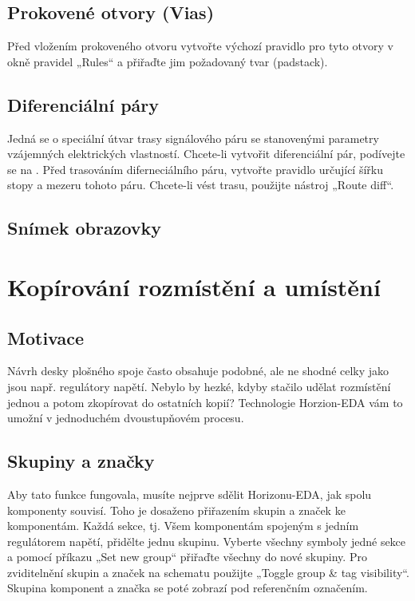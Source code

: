 \documentclass[letterpaper,10pt,czech]{sphinxmanual}
\begin{document}
\section{Prokovené otvory (Vias)}
\label{\detokenize{imp-board:prokovene-otvory-vias}}
Před vložením prokoveného otvoru vytvořte výchozí pravidlo pro tyto otvory v okně pravidel „Rules“
a přiřaďte jim požadovaný tvar (padstack).


\section{Diferenciální páry}
\label{\detokenize{imp-board:diferencialni-pary}}
Jedná se o speciální útvar trasy signálového páru se stanovenými parametry vzájemných elektrických vlastností. Chcete-li vytvořit diferenciální pár, podívejte se na {\hyperref[\detokenize{imp-sch:diferencialni-pary}]{}}. Před trasováním diferneciálního páru, vytvořte pravidlo určující šířku stopy a mezeru tohoto páru. Chcete-li vést trasu, použijte nástroj „Route diff“.


\section{Snímek obrazovky}
\label{\detokenize{imp-board:snimek-obrazovky}}
\noindent{}


\chapter{Kopírování rozmístění a umístění}
\label{\detokenize{copy-layout-placement:kopirovani-rozmisteni-a-umisteni}}\label{\detokenize{copy-layout-placement::doc}}

\section{Motivace}
\label{\detokenize{copy-layout-placement:motivace}}
Návrh desky plošného spoje často obsahuje podobné, ale ne shodné celky jako jsou např. regulátory napětí. Nebylo by hezké, kdyby stačilo udělat rozmístění jednou a potom zkopírovat do ostatních kopií? Technologie Horzion-EDA vám to umožní v jednoduchém dvoustupňovém procesu.


\section{Skupiny a značky}
\label{\detokenize{copy-layout-placement:skupiny-a-znacky}}
Aby tato funkce fungovala, musíte nejprve sdělit Horizonu-EDA, jak spolu komponenty souvisí. Toho je dosaženo přiřazením skupin a značek ke komponentám. Každá sekce, tj. Všem komponentám spojeným s
jedním regulátorem napětí, přidělte jednu skupinu. Vyberte všechny symboly jedné sekce a pomocí příkazu „Set new group“ přiřaďte všechny do nové skupiny. Pro zviditelnění skupin a značek na schematu použijte „Toggle group \& tag visibility“. Skupina komponent a značka se poté zobrazí pod referenčním označením.
\end{document}
